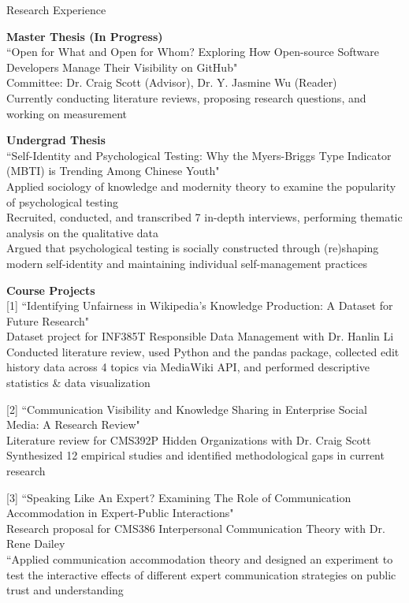 \documentclass[
	11pt, %
]{resume} %
\begin{document}
\begin{rSection}{Research Experience}

    \textbf{Master Thesis (In Progress)}\\ 
    “Open for What and Open for Whom? Exploring How Open-source Software Developers Manage Their Visibility on GitHub"\\
\textbullet\enspace Committee: Dr. Craig Scott (Advisor), Dr. Y. Jasmine Wu (Reader)\\
\textbullet\enspace Currently conducting literature reviews, proposing research questions, and working on measurement

    \textbf{Undergrad Thesis}\\ 
    “Self-Identity and Psychological Testing: Why the Myers-Briggs Type Indicator (MBTI) is Trending Among Chinese Youth"\\ 
\textbullet\enspace Applied sociology of knowledge and modernity theory to examine the popularity of psychological testing\\
\textbullet\enspace Recruited, conducted, and transcribed 7 in-depth interviews, performing thematic analysis on the qualitative data\\
\textbullet\enspace Argued that psychological testing is socially constructed through (re)shaping modern self-identity and maintaining individual self-management practices


    \textbf{Course Projects}\\ 
    \textnormal{[1]} “Identifying Unfairness in Wikipedia's Knowledge Production: A Dataset for Future Research"\\
\textbullet\enspace Dataset project for INF385T Responsible Data Management with Dr. Hanlin Li\\    
\textbullet\enspace Conducted literature review, used Python and the pandas package, collected edit history data across 4 topics via MediaWiki API, and performed descriptive statistics \& data visualization

   \textnormal{[2]} “Communication Visibility and Knowledge Sharing in Enterprise Social Media: A Research Review"\\
\textbullet\enspace Literature review for CMS392P Hidden Organizations with Dr. Craig Scott\\    
\textbullet\enspace Synthesized 12 empirical studies and identified methodological gaps in current research

  \textnormal{[3]} “Speaking Like An Expert? Examining The Role of Communication Accommodation in Expert-Public Interactions"\\
\textbullet\enspace Research proposal for CMS386 Interpersonal Communication Theory with Dr. Rene Dailey\\    
\textbullet\enspace “Applied communication accommodation theory and designed an experiment to test the interactive effects of different expert communication strategies on public trust and understanding


\end{rSection}
\end{document}
